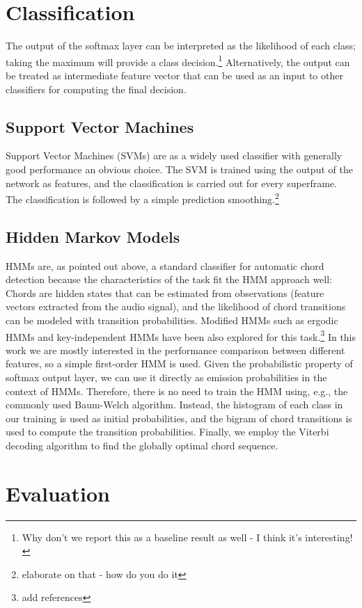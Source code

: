 \documentclass{article}
\begin{document}
\section{Classification}\label{sec:class}
The output of the softmax layer can be interpreted as the likelihood of each class; taking the maximum will provide a class decision.\footnote{Why don't we report this as a baseline result as well - I think it's interesting!} Alternatively, the output can be treated as intermediate feature vector that can be used as an input to other classifiers for computing the final decision. 
\subsection{Support Vector Machines}
Support Vector Machines (SVMs) are as a widely used classifier with generally good performance an obvious choice. The SVM is trained using the output of the network as features, and the classification is carried out for every superframe. The classification is followed by a simple prediction smoothing.\footnote{elaborate on that - how do you do it} 
\subsection{Hidden Markov Models}
HMMs are, as pointed out above, a standard classifier for automatic chord detection because the characteristics of the task fit the HMM approach well: Chords are hidden states that can be estimated from observations (feature vectors extracted from the audio signal), and the likelihood of chord transitions can be modeled with transition probabilities. 
Modified HMMs such as ergodic HMMs and key-independent HMMs have been also explored for this task.\footnote{add references} In this work we are mostly interested in the performance comparison between different features, so a simple first-order HMM is used. 
Given the probabilistic property of softmax output layer, we can use it directly as emission probabilities in the context of HMMs. Therefore, there is no need to train the HMM using, e.g., the commonly used Baum-Welch algorithm. Instead, the histogram of each class in our training is used as initial probabilities, and the bigram of chord transitions is used to compute the transition probabilities. Finally, we employ the Viterbi decoding algorithm to find the globally optimal chord sequence. 

\section{Evaluation}
\end{document}
